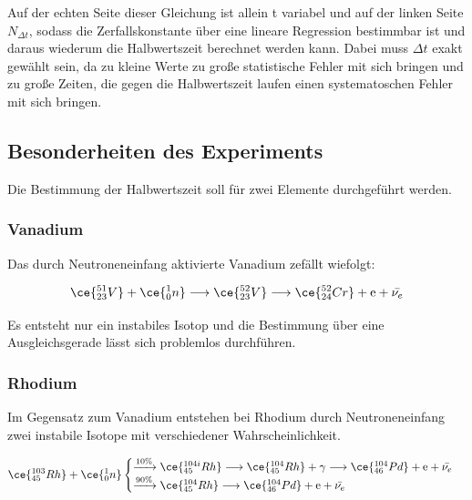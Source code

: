         \noindent
        Auf der echten Seite dieser Gleichung ist allein t variabel und auf der linken Seite $N_{\Delta t}$, sodass die Zerfallskonstante über eine lineare Regression bestimmbar ist und daraus 
        wiederum die Halbwertszeit berechnet werden kann. Dabei muss
        $\Delta t$ exakt gewählt sein, da zu kleine Werte zu große statistische Fehler mit sich bringen und zu große Zeiten, die gegen die Halbwertszeit laufen einen systematoschen Fehler mit
        sich bringen.

    \subsection{Besonderheiten des Experiments}
        Die Bestimmung der Halbwertszeit soll für zwei Elemente durchgeführt werden.

            \subsubsection*{Vanadium}
            Das durch Neutroneneinfang aktivierte Vanadium zefällt wiefolgt:

            \begin{equation*}
                \ce{^{51}_{23}V} + \ce{^{1}_{0}n} \longrightarrow \ce{^{52}_{23}V}  \longrightarrow \ce{^{52}_{24}Cr} + \text{e} + \bar{\nu_e}
            \end{equation*}

            \noindent 
            Es entsteht nur ein instabiles Isotop und die Bestimmung über eine Ausgleichsgerade lässt sich problemlos durchführen.
            
            \subsubsection*{Rhodium}
            Im Gegensatz zum Vanadium entstehen bei Rhodium durch Neutroneneinfang zwei instabile Isotope mit verschiedener Wahrscheinlichkeit.

            \begin{equation}
                \ce{^{103}_{45}Rh} + \ce{^{1}_{0}n}  \begin{cases}
                    \xrightarrow{10\%} \ce{^{104i}_{45}Rh} \longrightarrow \ce{^{104}_{45}Rh} + \gamma \longrightarrow \ce{^{104}_{46}Pd} + \text{e} + \bar{\nu_e} \\
                    \xrightarrow{90\%} \ce{^{104}_{45}Rh} \longrightarrow \ce{^{104}_{46}Pd} + \text{e} + \bar{\nu_e}
                \end{cases}
                \label{eqn:Rhodium}
            \end{equation}

